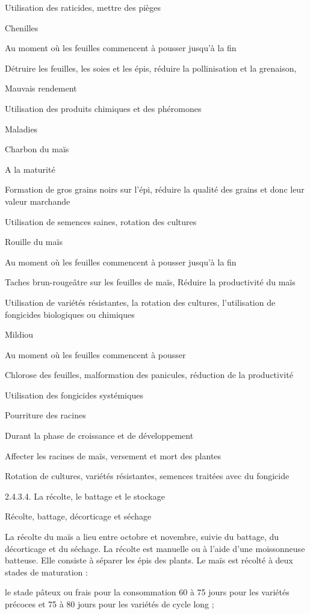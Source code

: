 \documentclass[12pt,oneside]{report}
\begin{document}
Utilisation des raticides, mettre des pièges

Chenilles

Au moment où les feuilles commencent à pousser jusqu’à la fin

Détruire les feuilles, les soies et les épis, réduire la pollinisation et la grenaison,

Mauvais rendement

Utilisation des produits chimiques et des phéromones

Maladies

Charbon du maïs

A la maturité

Formation de gros grains noirs sur l'épi, réduire la qualité des grains et donc leur valeur marchande

Utilisation de semences saines, rotation des cultures

Rouille du maïs

Au moment où les feuilles commencent à pousser jusqu’à la fin

Taches brun-rougeâtre sur les feuilles de maïs, Réduire la productivité du maïs

Utilisation de variétés résistantes, la rotation des cultures, l'utilisation de fongicides biologiques ou chimiques

Mildiou

Au moment où les feuilles commencent à pousser

Chlorose des feuilles, malformation des panicules, réduction de la productivité

Utilisation des fongicides systémiques

Pourriture des racines

Durant la phase de croissance et de développement

Affecter les racines de maïs, versement et mort des plantes

Rotation de cultures, variétés résistantes, semences traitées avec du fongicide

2.4.3.4. La récolte, le battage et le stockage

Récolte, battage, décorticage et séchage

La récolte du maïs a lieu entre octobre et novembre, suivie du battage, du décorticage et du séchage. La récolte est manuelle ou à l’aide d’une moissonneuse batteuse. Elle consiste à séparer les épis des plants. Le maïs est récolté à deux stades de maturation :

le stade pâteux ou frais pour la consommation 60 à 75 jours pour les variétés précoces et 75 à 80 jours pour les variétés de cycle long ;
\end{document}
